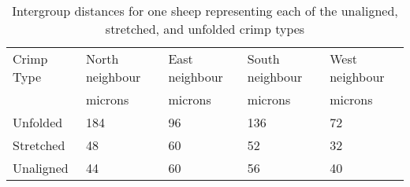 %

\begin{table}[htp]
\centering
\caption{Intergroup distances for one sheep representing each of the unaligned, stretched, and unfolded crimp types}
\label{tab:igdist}
\vspace{0.1in}
\begin{tabular}{|p{0.7in}|p{0.6in}|p{0.6in}|p{0.6in}|p{0.6in}|}  \hline
     Crimp Type & North neighbour & East neighbour & South neighbour  & West neighbour  \\ 
   & microns  & microns & microns & microns \\ \hline
 Unfolded & 184 & 96 & 136 & 72 \\
 Stretched & 48 & 60 & 52 & 32  \\
 Unaligned & 44 & 60 & 56 & 40 \\ \hline
\end{tabular}
\end{table}

%
